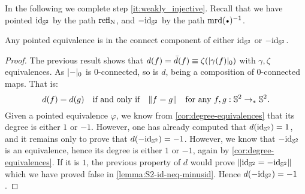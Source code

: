 \documentclass[english,a4paper]{lmcs}
\begin{document}
In the following we complete step \ref{it:weakly_injective}.
Recall that we have pointed $\mathord{\mathrm{id}}_{{\mathbb S^{2}}}$ by the path $\mathop{{\mathrm{refl}}_{\mathrm{N}}}$,
and $-\mathord{\mathrm{id}}_{{\mathbb S^{2}}}$ by the path $\inv{\mrd(\base)}$.
\begin{cor}
  Any pointed equivalence is in the connect component of either $\mathord{\mathrm{id}}_{{\mathbb S^{2}}}$ or $-\mathord{\mathrm{id}}_{{\mathbb S^{2}}}$.
  \label{cor:equivalence-conn-component}
\end{cor}
\begin{proof}
  The previous result shows that $d(f) = \bar d(f) \equiv
  \zeta(\lvert\gamma(f)\rvert_0)$ with $\gamma, \zeta$ equivalences. As
  $\lvert\mathord{{-}}\rvert_0$ is $0$-connected, so is $d$, being a composition of
  $0$-connected maps. That is:
  \begin{displaymath}
    d(f) = d(g) \quad \text{if and only if}\quad
    \lVert f = g\rVert \quad \text{for any}\ f,g:{{\mathbb S^{2}}} \to_\ast{{\mathbb S^{2}}}.
  \end{displaymath}
  Given a pointed equivalence $\varphi$, we know from
  \cref{cor:degree-equivalences} that its degree is either $1$ or $-1$.
  However, one has already computed that $d(\mathord{\mathrm{id}}_{{\mathbb S^{2}}}) = 1$, and it remains only
  to prove that $d(-\mathord{\mathrm{id}}_{{\mathbb S^{2}}}) = -1$. However, we know that $-\mathord{\mathrm{id}}_{{\mathbb S^{2}}}$ is an
  equivalence, hence its degree is either $1$ or $-1$, again by
  \cref{cor:degree-equivalences}. If it is $1$, the previous property of $d$
  would prove $\lVert\mathord{\mathrm{id}}_{{\mathbb S^{2}}} = -\mathord{\mathrm{id}}_{{\mathbb S^{2}}}\rVert$ which we have proved false in
  \cref{lemma:S2-id-neq-minusid}. Hence $d(-\mathord{\mathrm{id}}_{{\mathbb S^{2}}}) = -1$.

\end{proof}
\end{document}
